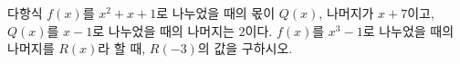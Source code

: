 다항식 $f(x)$를 $x^2+x+1$로 나누었을 때의 몫이 $Q(x)$, 나머지가 $x+7$이고, $Q(x)$를 $x-1$로 나누었을 때의 나머지는 $2$이다. $f(x)$를 $x^3-1$로 나누었을 때의 나머지를 $R(x)$라 할 때, $R(-3)$의 값을 구하시오.
